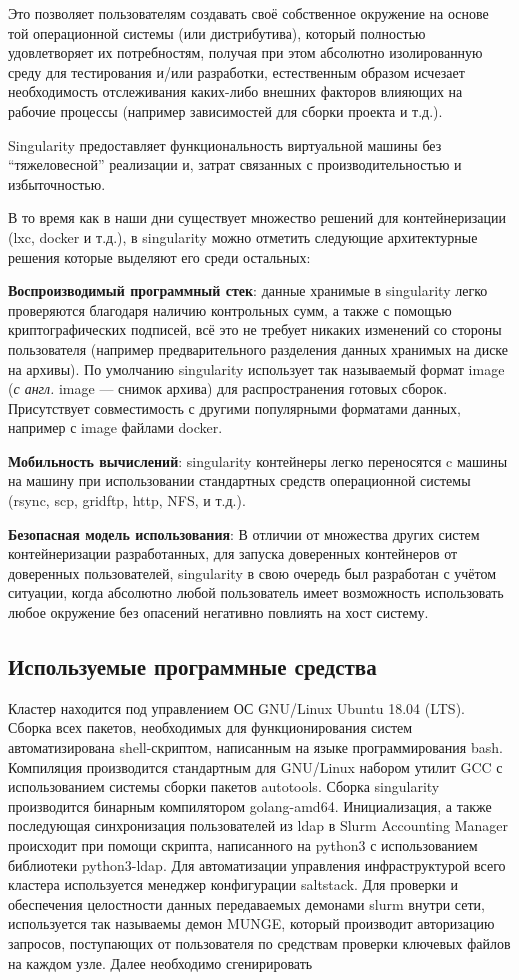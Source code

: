 \documentclass[a4paper]{extarticle}
\begin{document}
Это позволяет пользователям создавать своё собственное окружение на основе той операционной системы (или дистрибутива), который полностью удовлетворяет их
потребностям, получая при этом абсолютно изолированную среду для тестирования и/или разработки, естественным образом исчезает необходимость отслеживания каких-либо внешних факторов влияющих на рабочие процессы (например зависимостей для сборки проекта и т.д.).

Singularity предоставляет функциональность виртуальной машины без \enquote{тяжеловесной}  реализации и, затрат связанных с производительностью и избыточностью.

В то время как в наши дни существует множество решений для контейнеризации (lxc, docker и т.д.), в singularity можно отметить следующие архитектурные решения которые выделяют его среди остальных:

\textbf{Воспроизводимый программный стек}: данные хранимые в singularity легко проверяются благодаря наличию контрольных сумм, а также с помощью криптографических подписей, всё это не требует никаких изменений со стороны пользователя (например предварительного разделения данных хранимых на диске на архивы). По умолчанию singularity использует так называемый формат image (\emph{с англ.} image --- снимок архива) для распространения готовых сборок.
Присутствует совместимость с другими популярными форматами данных, например с image файлами docker.

\textbf{Мобильность вычислений}: singularity контейнеры легко переносятся c машины на машину при  использовании стандартных средств операционной системы (rsync, scp, gridftp, http, NFS, и т.д.).

\textbf{Безопасная модель использования}: В отличии от множества других систем контейнеризации разработанных, для запуска доверенных контейнеров от доверенных пользователей, singularity в свою очередь был разработан с учётом ситуации, когда абсолютно любой пользователь имеет возможность использовать любое окружение без опасений негативно повлиять на хост систему.

\subsection*{Используемые программные средства}

Кластер находится под управлением ОС GNU/Linux Ubuntu 18.04 (LTS). Сборка всех пакетов, необходимых для функционирования систем автоматизирована  shell-скриптом, написанным на языке программирования bash. Компиляция производится стандартным для GNU/Linux набором утилит GCC с использованием системы сборки пакетов autotools. Сборка singularity производится бинарным компилятором golang-amd64.
Инициализация, а также последующая синхронизация пользователей из ldap в Slurm Accounting Manager происходит при помощи скрипта, написанного на python3 с
использованием библиотеки python3-ldap. Для автоматизации управления инфраструктурой всего кластера используется менеджер конфигурации saltstack.
Для проверки и обеспечения целостности данных передаваемых демонами slurm внутри сети, используется так называемы демон MUNGE, который производит авторизацию запросов, поступающих от пользователя по средствам проверки ключевых файлов на каждом узле.
Далее необходимо сгенирировать 
\end{document}

